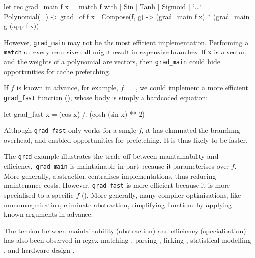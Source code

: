 \begin{code}
\begin{ocamllst}
let rec grad_main f x = match f with
  | Sin
  | Tanh
  | Sigmoid
  | `$\ldots$`
  | Polynomial(_) -> grad_of f x 
  | Compose(f, g) -> (grad_main f x) * (grad_main g (app f x))
\end{ocamllst}
%
\label{listing:ocaml-grad-main}
\end{code}

However, \texttt{grad_main} may not be the most efficient implementation. Performing a \texttt{match} on every recursive call might result in expensive branches. If \texttt{x} is a vector, and the weights of a polynomial are vectors, then \texttt{grad_main} could hide opportunities for cache prefetching.

If $f$ is known in advance, for example, $f =$ , we could implement a more efficient \texttt{grad_fast} function (), whose body is simply a hardcoded equation:

\begin{code}
\begin{ocamllst}
let grad_fast x = (cos x) /. (cosh (sin x) ** 2)
\end{ocamllst}
\label{listing:ocaml-grad-fast}
\end{code}    

Although \texttt{grad_fast} only works for a single $f$, it has eliminated the branching overhead, and enabled opportunities for prefetching. It is thus likely to be faster.

The \texttt{grad} example illustrates the trade-off between maintainability and efficiency.\ \texttt{grad_main} is maintainable in part because it parameterises over $f$. More generally, abstraction centralises implementations, thus reducing maintenance costs. However, \texttt{grad_fast} is more efficient because it is more specialised to a specific $f$ (). More generally, many compiler optimisations, like monomorphisation, eliminate abstraction, simplifying functions by applying known arguments in advance. 

The tension between maintainability (abstraction) and efficiency (specialisation) has also been observed in regex matching \citep{tratt-2008}, parsing \citep{yallop-2023}, linking \citep{servetto-2013}, statistical modelling \citep{wickham-2019}, and hardware design \citep{vandebon-2021}.

